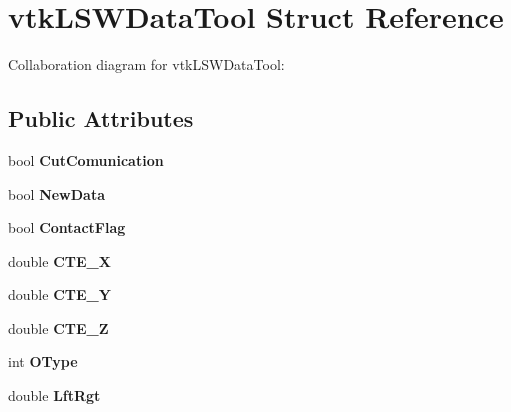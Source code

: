 \hypertarget{structvtkLSWDataTool}{
\section{vtkLSWDataTool Struct Reference}
\label{structvtkLSWDataTool}
}
Collaboration diagram for vtkLSWDataTool:\subsection*{Public Attributes}
\begin{DoxyCompactItemize}
\item 
\hypertarget{structvtkLSWDataTool_ab1ef71d0f02968b52c01c4d118f3740c}{
bool {\bfseries CutComunication}}
\label{structvtkLSWDataTool_ab1ef71d0f02968b52c01c4d118f3740c}

\item 
\hypertarget{structvtkLSWDataTool_ac476d3803537f5dcb3199024e6c3d1c5}{
bool {\bfseries NewData}}
\label{structvtkLSWDataTool_ac476d3803537f5dcb3199024e6c3d1c5}

\item 
\hypertarget{structvtkLSWDataTool_a44c6b8d067ffcd98f1abc0fc9af4e081}{
bool {\bfseries ContactFlag}}
\label{structvtkLSWDataTool_a44c6b8d067ffcd98f1abc0fc9af4e081}

\item 
\hypertarget{structvtkLSWDataTool_a6bd74db0e0892acfdfd1f3b142779b63}{
double {\bfseries CTE\_\-X}}
\label{structvtkLSWDataTool_a6bd74db0e0892acfdfd1f3b142779b63}

\item 
\hypertarget{structvtkLSWDataTool_afab8a325e115e9a8b493621c9cda3ca6}{
double {\bfseries CTE\_\-Y}}
\label{structvtkLSWDataTool_afab8a325e115e9a8b493621c9cda3ca6}

\item 
\hypertarget{structvtkLSWDataTool_ab0e84855b368f6efdb2826d56a9c1853}{
double {\bfseries CTE\_\-Z}}
\label{structvtkLSWDataTool_ab0e84855b368f6efdb2826d56a9c1853}

\item 
\hypertarget{structvtkLSWDataTool_aa6f7305733227d98bc45a6b2d03b2efb}{
int {\bfseries OType}}
\label{structvtkLSWDataTool_aa6f7305733227d98bc45a6b2d03b2efb}

\item 
\hypertarget{structvtkLSWDataTool_a8297e2134fc214bf019e080e45ac28e4}{
double {\bfseries LftRgt}}
\label{structvtkLSWDataTool_a8297e2134fc214bf019e080e45ac28e4}


\end{DoxyCompactItemize}
